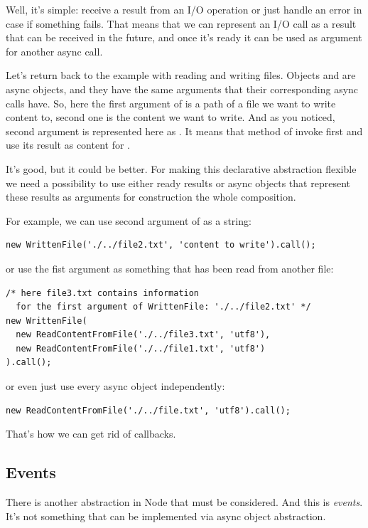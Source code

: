 \documentclass{article}
\newcommand{\cit}[1]{{\fontfamily{qcr}\selectfont{\textcolor{superdarkgray}{#1}}}}
\begin{document}
Well, it's simple: receive a result from an I/O operation or just handle an error in case if something fails. That means that we can represent an I/O call as a result that can be received in the future, and once it's ready it can be used as argument for another async call.

Let's return back to the example with reading and writing files. Objects \cit{WrittenFile} and \cit{ReadContentFromFile} are async objects, and they have the same arguments that their corresponding async calls have. So, here the first argument of \cit{WrittenFile} is a path of a file we want to write content to, second one is the content we want to write. And as you noticed, second argument is represented here as \cit{ReadContentFromFile}. It means that method \cit{call()} of \cit{WrittenFile} invoke first \cit{ReadContentFromFile} and use its result as content for \cit{WrittenFile}.

It's good, but it could be better. For making this declarative abstraction flexible we need a possibility to use either ready results or async objects that represent these results as arguments for construction the whole composition.

For example, we can use second argument of \cit{WrittenFile} as a string:

\begin{lstlisting}
new WrittenFile('./../file2.txt', 'content to write').call();
\end{lstlisting}
or use the fist argument as something that has been read from another file:
\begin{lstlisting}
/* here file3.txt contains information 
  for the first argument of WrittenFile: './../file2.txt' */
new WrittenFile(
  new ReadContentFromFile('./../file3.txt', 'utf8'), 
  new ReadContentFromFile('./../file1.txt', 'utf8')
).call();
\end{lstlisting}
or even just use every async object independently:

\begin{lstlisting}
new ReadContentFromFile('./../file.txt', 'utf8').call();
\end{lstlisting}

That's how we can get rid of callbacks.

\subsection{Events}

There is another abstraction in Node that must be considered. And this is \textit{events}. It's not something that can be implemented via async object abstraction.
\end{document}
